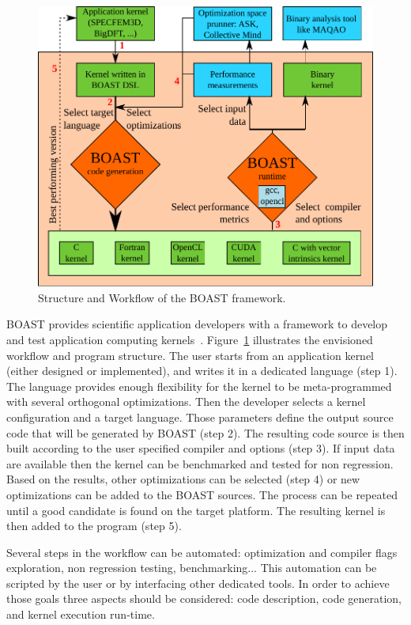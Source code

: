\documentclass{IEEEtran}
\begin{document}
\begin{figure}
\begin{center}
\includegraphics[width=\columnwidth]{BOAST_Workflow.pdf}
\caption{Structure and Workflow of the BOAST framework.}
\label{fig:boast_workflow}
\end{center}
\end{figure}

BOAST provides scientific application developers with a framework to develop and
test application computing kernels~\cite{videau2013boast}.
Figure~\ref{fig:boast_workflow} illustrates the envisioned workflow and program
structure.  The user starts from an application kernel (either designed or
implemented), and writes it in a dedicated language (step 1).  The language
provides enough flexibility for the kernel to be meta-programmed with several
orthogonal optimizations. Then the developer selects a kernel configuration and
a target language. Those parameters define the output source code that will be
generated by BOAST (step 2). The resulting code source is then built according
to the user specified compiler and options (step 3). If input data are available
then the kernel can be benchmarked and tested for non regression. Based on the
results, other optimizations can be selected (step 4) or new optimizations can
be added to the BOAST sources. The process can be repeated until a good
candidate is found on the target platform. The resulting kernel is then added to
the program (step 5).

Several steps in the workflow can be automated: optimization and compiler flags
exploration, non regression testing, benchmarking... This automation can be
scripted by the user or by interfacing other dedicated tools. In order
to achieve those goals three aspects should be considered: code description,
code generation, and kernel execution run-time.
\end{document}
